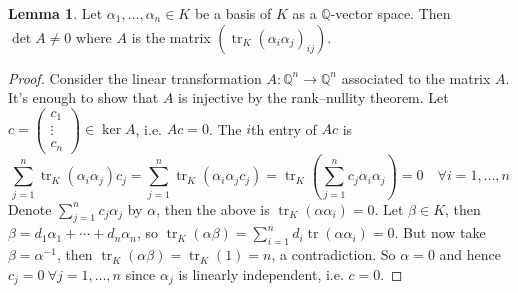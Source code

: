 \documentclass{article}
\newcommand{\Q}{\mathbb{Q}}
\newcommand{\tr}{\operatorname{tr}}
\theoremstyle{definition}
\newtheorem{lemma}[defn]{Lemma}
\begin{document}
\begin{lemma}
\label{lemma:trMatisinv}
Let $\alpha_1,\ldots,\alpha_n\in K$ be a basis of $K$ as a $\Q$-vector space. Then $\det A\neq 0$ where $A$ is the matrix $\left(\tr_K(\alpha_i\alpha_j)_{ij}\right)$.
\end{lemma}
\begin{proof}
Consider the linear transformation $A:\Q^n\rightarrow\Q^n$ associated to the matrix $A$. It's enough to show that $A$ is injective by the rank--nullity theorem. Let $c=\begin{pmatrix}
c_1 \\ \vdots \\ c_n
\end{pmatrix}\in\ker A$, i.e. $Ac=0$. The $i$th entry of $Ac$ is
\[
\sum_{j=1}^n \tr_K(\alpha_i\alpha_j)c_j=\sum_{j=1}^n \tr_K(\alpha_i\alpha_jc_j)=\tr_K\left(\sum_{j=1}^n c_j \alpha_i\alpha_j\right)=0 \quad \forall i=1,\ldots,n
\]
Denote $\sum_{j=1}^nc_j\alpha_j$ by $\alpha$, then the above is $\tr_K(\alpha\alpha_i)=0$. Let $\beta\in K$, then $\beta=d_1\alpha_1+\cdots+d_n\alpha_n$, so $\tr_K(\alpha\beta)=\sum_{i=1}^n d_i\tr(\alpha\alpha_i)=0$. But now take $\beta=\alpha^{-1}$, then $\tr_K(\alpha\beta)=\tr_K(1)=n$, a contradiction. So $\alpha=0$ and hence $c_j=0 \ \forall j=1,\ldots,n$ since $\alpha_j$ is linearly independent, i.e. $c=0$.
\end{proof}
\end{document}
